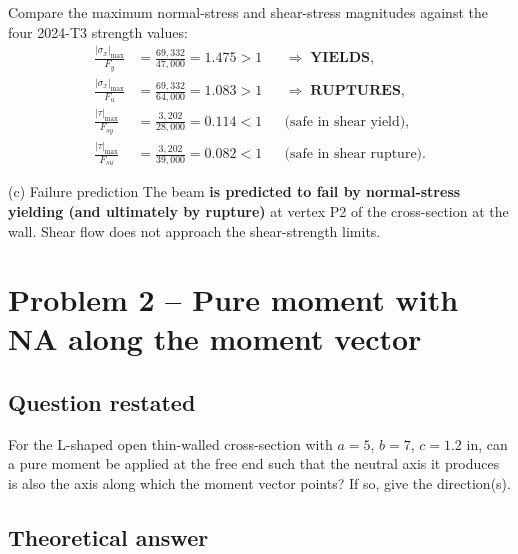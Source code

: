 \documentclass[11pt]{article}
\begin{document}
Compare the maximum normal-stress and shear-stress magnitudes against the four 2024-T3 strength values:
\begin{align*}
\frac{|\sigma_x|_{\max}}{F_y} &= \frac{69{,}332}{47{,}000} = 1.475 > 1 &&\Longrightarrow\; \textbf{YIELDS},\\[2pt]
\frac{|\sigma_x|_{\max}}{F_u} &= \frac{69{,}332}{64{,}000} = 1.083 > 1 &&\Longrightarrow\; \textbf{RUPTURES},\\[2pt]
\frac{|\tau|_{\max}}{F_{sy}} &= \frac{3{,}202}{28{,}000} = 0.114 < 1 &&\text{(safe in shear yield)},\\[2pt]
\frac{|\tau|_{\max}}{F_{su}} &= \frac{3{,}202}{39{,}000} = 0.082 < 1 &&\text{(safe in shear rupture)}.
\end{align*}

\begin{answerbox}{(c) Failure prediction}
The beam \textbf{is predicted to fail by normal-stress yielding (and ultimately by rupture)} at vertex P2 of the cross-section at the wall. Shear flow does not approach the shear-strength limits.
\end{answerbox}

\section*{Problem 2 -- Pure moment with NA along the moment vector}

\subsection*{Question restated}

For the L-shaped open thin-walled cross-section with $a = 5$, $b = 7$, $c = 1.2$ in, can a pure moment be applied at the free end such that the neutral axis it produces is also the axis along which the moment vector points? If so, give the direction(s).

\subsection*{Theoretical answer}
\end{document}
